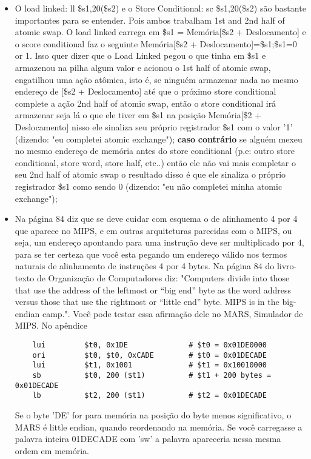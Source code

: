 \documentclass{article}
\begin{document}
\begin{itemize}
\item O load linked: ll \$s1,20(\$s2) e o Store Conditional: sc \$s1,20(\$s2)
são bastante importantes para se entender. Pois ambos trabalham 1st and 2nd half
of atomic swap. O load linked carrega em \$s1 = Memória[\$s2 + Deslocamento] e o
score conditional faz o seguinte Memória[\$s2 + Deslocamento]=\$s1;\$s1={0 or
1}. Isso quer dizer que o Load Linked pegou o que tinha em \$s1 e armazenou na
pilha algum valor e acionou o 1st half of atomic swap, engatilhou uma ação
atômica, isto é, se ninguém armazenar nada no mesmo endereço de [\$s2 +
Deslocamento] até que o próximo store conditional complete a ação 2nd half of
atomic swap, então o store conditional irá armazenar seja lá o que ele tiver em
\$s1 na posição Memória[\$2 + Deslocamento] nisso ele sinaliza seu próprio
registrador \$s1 com o valor '1' (dizendo: "eu completei atomic exchange");
\textbf{caso} \textbf{contrário} se alguém mexeu no mesmo endereço de memória
antes do store conditional (p.e: outro store conditional, store word, store
half, etc..) então ele não vai mais completar o seu 2nd half of atomic swap o
resultado disso é que ele sinaliza o próprio registrador \$s1 como sendo 0
(dizendo: "eu não completei minha atomic exchange");

\item Na página 84 diz que se deve cuidar com esquema o de alinhamento 4 por 4
que aparece no MIPS, e em outras arquiteturas parecidas com o MIPS, ou seja, um
endereço apontando para uma instrução deve ser multiplicado por 4, para se ter
certeza que você esta pegando um endereço válido nos termos naturais de
alinhamento de instruções 4 por 4 bytes. Na página 84 do livro-texto de
Organização de Computadores diz: "Computers divide into those that use the
address of the leftmost or “big end” byte as the word address versus those that
use the rightmost or “little end” byte. MIPS is in the big-endian camp.". Você 
pode testar essa afirmação dele no MARS, Simulador de MIPS. No apêndice 
  \begin{verbatim}
    lui         $t0, 0x1DE              # $t0 = 0x01DE0000
    ori         $t0, $t0, 0xCADE        # $t0 = 0x01DECADE 
    lui         $t1, 0x1001             # $t1 = 0x10010000
    sb          $t0, 200 ($t1)          # $t1 + 200 bytes = 0x01DECADE 
    lb          $t2, 200 ($t1)          # $t2 = 0x01DECADE
  \end{verbatim}
Se o byte 'DE' for para memória na posição do byte menos significativo, o MARS 
é little endian, quando reordenando na memória. Se você carregasse a palavra 
inteira 01DECADE com 'sw' a palavra apareceria nessa mesma ordem em memória.


\end{itemize}
\end{document}
